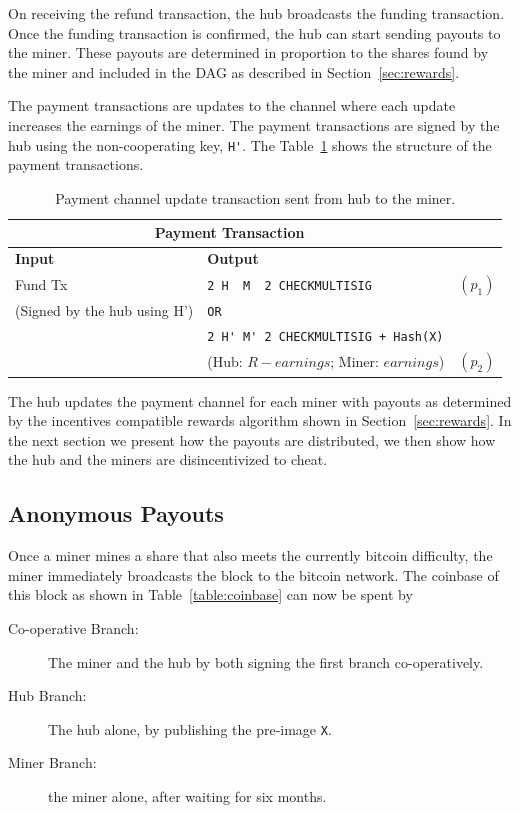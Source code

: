 \documentclass{article}
\begin{document}
On receiving the refund transaction, the hub broadcasts the funding
transaction. Once the funding transaction is confirmed, the hub can
start sending payouts to the miner. These payouts are determined in
proportion to the shares found by the miner and included in the DAG as
described in Section~\ref{sec:rewards}.

The payment transactions are updates to the channel where each update
increases the earnings of the miner. The payment transactions are
signed by the hub using the non-cooperating key, \verb|H'|. The
Table~\ref{payment-transaction} shows the structure of the payment
transactions.

\begin{table}
  \centering
  \begin{tabular}{ llr }
    \multicolumn{2}{c}{\bfseries Payment Transaction} \\
    \midrule
    \bfseries Input & \bfseries Output \\
    \midrule
    Fund Tx & \verb|2 H  M  2 CHECKMULTISIG| & $(p_1)$ \\
    (Signed by the hub using H') & \verb|OR| \\
                    & \verb|2 H' M' 2 CHECKMULTISIG + Hash(X)| \\
                    & (Hub: $R - earnings$; Miner: $earnings$) & $(p_2)$\\
    \midrule
  \end{tabular}
  \caption{Payment channel update transaction sent from hub to the
    miner.}\label{payment-transaction}
\end{table}

The hub updates the payment channel for each miner with payouts as
determined by the incentives compatible rewards algorithm shown in
Section~\ref{sec:rewards}. In the next section we present how the
payouts are distributed, we then show how the hub and the miners are
disincentivized to cheat.

\subsection{Anonymous Payouts}

Once a miner mines a share that also meets the currently bitcoin
difficulty, the miner immediately broadcasts the block to the bitcoin
network. The coinbase of this block as shown in
Table~\ref{table:coinbase} can now be spent by

\begin{description}
\item[Co-operative Branch:] The miner and the hub by both signing the
  first branch co-operatively.
\item[Hub Branch:] The hub alone, by publishing the pre-image \verb|X|.
\item[Miner Branch:] the miner alone, after waiting for six months.
\end{description}
\end{document}
